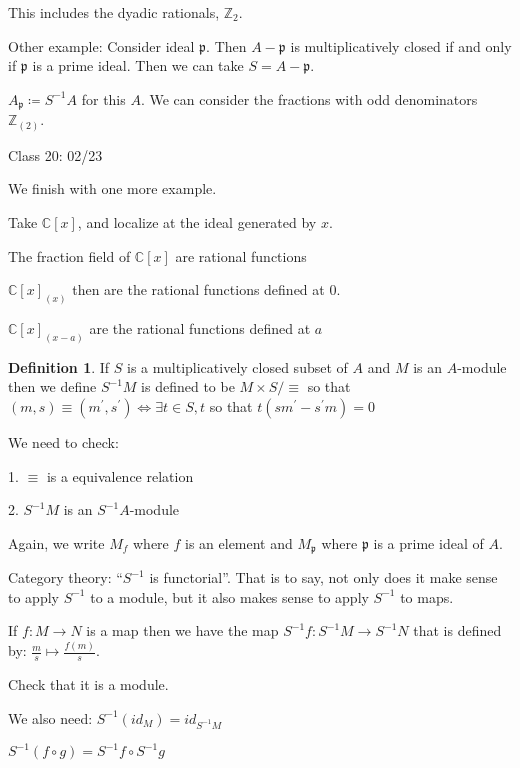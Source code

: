 \documentclass{article}
\theoremstyle{definition}
\newtheorem{definition}{Definition}
\begin{document}
This includes the dyadic rationals, \(\mathbb{Z}_2\).

Other example: Consider ideal \(\mathfrak{p}\). Then \(A - \mathfrak{p}\) is multiplicatively closed if and only if \(\mathfrak{p}\) is a prime ideal. Then we can take \(S = A - \mathfrak{p}\).

\(A_{\mathfrak{p}} \coloneqq S ^{-1} A\) for this \(A\). We can consider the fractions with odd denominators \(\mathbb{Z}_{(2)}\).

\hrulefill

Class 20: 02/23

We finish with one more example.

Take \(\mathbb{C} [x]\), and localize at the ideal generated by \(x\).

The fraction field of \(\mathbb{C} [x]\) are rational functions

\(\mathbb{C} [x]_{(x)}\) then are the rational functions defined at \(0\).

\(\mathbb{C} [x]_{(x-a)}\) are the rational functions defined at \(a\)

\begin{definition}
    If \(S\) is a multiplicatively closed subset of \(A\) and \(M\) is an \(A\)-module then we define \(S ^{-1} M\) is defined to be \(M \times S / \equiv\) so that \((m,s) \equiv (m^{\prime} , s^{\prime} ) \iff \exists t\in S, t\) so that \(t(sm^{\prime} - s^{\prime} m) = 0\) 
\end{definition}

We need to check:

1. \(\equiv\) is a equivalence relation

2. \(S ^{-1} M\) is an \(S ^{-1} A\)-module

Again, we write \(M_f\) where \(f\) is an element and \(M_{\mathfrak{p}} \) where \(\mathfrak{p}\) is a prime ideal of \(A\).

Category theory: ``\(S^{-1}\) is functorial''. That is to say, not only does it make sense to apply \(S ^{-1} \) to a module, but it also makes sense to apply \(S ^{-1} \) to maps.

If \(f:M \to N\) is a map then we have the map \(S ^{-1} f: S ^{-1} M \to S ^{-1} N\) that is defined by: \(\frac{m}{s} \mapsto \frac{f(m)}{s}\). 

Check that it is a module.

We also need: \(S ^{-1} (id_M) = id_{S ^{-1} M}\) 

\(S ^{-1} (f \circ g) = S ^{-1} f \circ S ^{-1} g\) 
\end{document}
